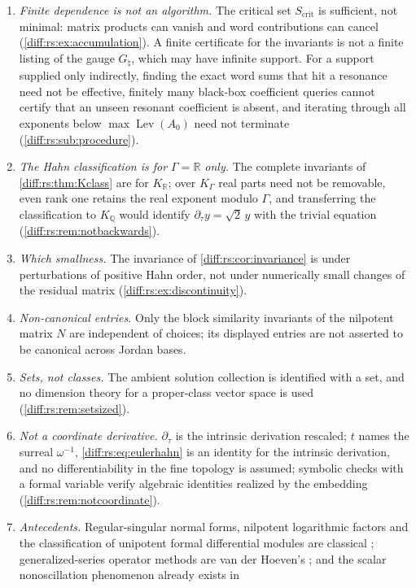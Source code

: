 \documentclass[11pt,letterpaper]{article}
\numberwithin{equation}{section}
\theoremstyle{definition}
\theoremstyle{remark}
\newcommand{\R}{\mathbb R}
\newcommand{\Q}{\mathbb Q}
\newcommand{\der}{\partial}
\newcommand{\derT}{\der_{\tau}}
\newcommand{\KR}{K_{\R}}
\newcommand{\Lev}{\operatorname{Lev}}
\newcommand{\crit}{\mathrm{crit}}
\begin{document}
\begin{enumerate}[label=\textup{N\arabic*.},leftmargin=3.0em,itemsep=0.35em,start=65]
involved (\cref{diff:rs:rem:fredholm}).
\item \emph{Finite dependence is not an algorithm.} The critical set $S_{\crit}$
is sufficient, not minimal: matrix products can vanish and word contributions
can cancel (\cref{diff:rs:ex:accumulation}). A finite certificate for the
invariants is not a finite listing of the gauge $G_{\natural}$, which may have
infinite support. For a support supplied only indirectly, finding the exact word
sums that hit a resonance need not be effective, finitely many black-box
coefficient queries cannot certify that an unseen resonant coefficient is absent,
and iterating through all exponents below $\max\Lev(A_{0})$ need not terminate
(\cref{diff:rs:sub:procedure}).
\item \emph{The Hahn classification is for $\Gamma=\R$ only.} The complete
invariants of \cref{diff:rs:thm:Kclass} are for $\KR$; over $K_{\Gamma}$ real parts
need not be removable, even rank one retains the real exponent modulo $\Gamma$,
and transferring the classification to $K_{\Q}$ would identify $\derT y=\sqrt2\,y$
with the trivial equation (\cref{diff:rs:rem:notbackwards}).
\item \emph{Which smallness.} The invariance of \cref{diff:rs:cor:invariance} is
under perturbations of positive Hahn order, not under numerically small changes
of the residual matrix (\cref{diff:rs:ex:discontinuity}).
\item \emph{Non-canonical entries.} Only the block similarity invariants of the
nilpotent matrix $N$ are independent of choices; its displayed entries are not
asserted to be canonical across Jordan bases.
\item \emph{Sets, not classes.} The ambient solution collection is identified
with a set, and no dimension theory for a proper-class vector space is used
(\cref{diff:rs:rem:setsized}).
\item \emph{Not a coordinate derivative.} $\derT$ is the intrinsic derivation
rescaled; $t$ names the surreal $\omega^{-1}$,
\cref{diff:rs:eq:eulerhahn} is an identity for the intrinsic derivation, and no
differentiability in the fine topology is assumed; symbolic checks with a formal
variable verify algebraic identities realized by the embedding
(\cref{diff:rs:rem:notcoordinate}).
\item \emph{Antecedents.} Regular-singular normal forms, nilpotent logarithmic
factors and the classification of unipotent formal differential modules are
classical \cite{Levelt,KW}; generalized-series operator methods are van der
Hoeven's \cite{vdH}; and the scalar nonoscillation phenomenon already exists in

\end{enumerate}
\end{document}
